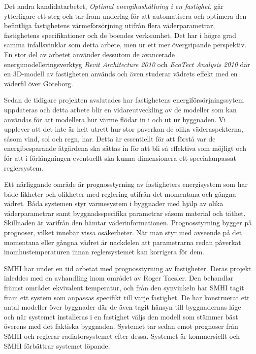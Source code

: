 Det andra kandidatarbetet, \textit{Optimal energihushållning i en fastighet}\cite{kandidatarbete2010},
går ytterligare ett steg och tar fram underlag för att automatisera och
optimera den befintliga fastighetens värmeförsörjning utifrån
flera väderparametrar, fastighetens specifikationer och de boendes verksamhet. Det har i högre grad samma infallsvinklar som detta arbete, men ur ett mer övergripande perspektiv. En stor del av arbetet använder dessutom de avancerade energimodelleringsverktyg \emph{Revit Architecture 2010} och 
\emph{EcoTect Analysis 2010} där en 3D-modell av fastigheten används och även studerar vädrets effekt med en väderfil över Göteborg.

Sedan de tidigare projekten avslutades har fastighetens energiförsörjningssytem uppdateras och detta arbete blir en vidareutveckling av de modeller som kan användas för att modellera hur värme flödar in i och ut ur byggnaden. Vi upplever att det inte är helt utrett hur stor påverkan de olika väderaspekterna, såsom vind, sol och regn, har. Detta är essentiellt för att förstå var de energibesparande åtgärdena ska sättas in för att bli så effektiva som möjligt och för att i förlängningen eventuellt ska kunna dimensionera ett specialanpassat reglersystem.

Ett närliggande område är prognosstyrning av fastigheters energisystem som har både likheter och olikheter med reglering utifrån det momentana och gångna vädret. Båda systemen styr värmesystem i byggnader med hjälp av olika väderparametrar samt byggnadsspecifika parametrar såsom material och täthet. Skillnaden är varifrån den hämtar väderinformationen. Prognosstyrning bygger på prognoser, vilket innebär vissa osäkerheter. När man styr med avseende på det momentana eller gångna vädret är nackdelen att parametrarna redan påverkat inomhustemperaturen innan reglersystemet kan korrigera för dem.

SMHI har under en tid arbetat med prognosstyrning av fastigheter. Deras projekt inleddes med en avhandling inom området av Roger Taesler. Den behandlar främst området ekvivalent temperatur, och från den synvinkeln har SMHI tagit fram ett system som anpassas specifikt till varje fastighet. De har konstruerat ett antal modeller över byggnader där de även tagit hänsyn till byggnadernas läge och när systemet installeras i en fastighet väljs den modell som stämmer bäst överens med det faktiska byggnaden. Systemet tar sedan emot prognoser från SMHI och reglerar radiatorsystemet efter dessa. Systemet är kommersiellt och SMHI förbättrar systemet löpande.






